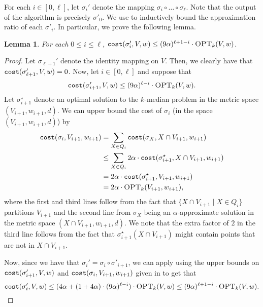 \documentclass[11pt]{article}
\newcommand{\1}{\mathmybb{1}}
\newtheorem{lemma}[theorem]{Lemma}
\newcommand{\OPT}{\textsc{OPT}}
\newcommand{\cost}{\textnormal{\texttt{cost}}}
\begin{document}
For each $i \in [0, \ell]$, let $\sigma_i'$ denote the mapping $\sigma_i \circ \dots \circ \sigma_\ell$. Note that the output of the algorithm is precisely $\sigma'_0$.
We use  to inductively bound the approximation ratio of each $\sigma'_i$. In particular, we prove the following lemma.

\begin{lemma}\label{lem:apx rec}
    For each $0 \leq i \leq \ell$, $\cost (\sigma'_{i}, V, w) \leq (9\alpha)^{\ell + 1 - i} \cdot \OPT_k(V, w)$.
\end{lemma}

\begin{proof}
    Let $\sigma_{\ell + 1}'$ denote the identity mapping on $V$. Then, we clearly have that $\cost(\sigma'_{\ell + 1}, V, w) = 0$.
    Now, let $i \in [0,\ell]$ and suppose that
    \begin{equation}\label{eq:apx 1}
        \cost (\sigma_{i+1}', V, w) \leq (9\alpha)^{\ell - i} \cdot \OPT_k(V, w).
    \end{equation}
    Let $\sigma^\star_{i+1}$ denote an optimal solution to the $k$-median problem in the metric space $(V_{i+1}, w_{i+1}, d)$.
    We can upper bound the cost of $\sigma_i$ (in the space $(V_{i+1}, w_{i+1}, d)$) by
    \begin{align}
        \cost(\sigma_i, V_{i+1}, w_{i+1}) &= \sum_{X \in Q_i} \cost(\sigma_X, X \cap V_{i+1}, w_{i+1})\nonumber\\
        &\leq \sum_{X \in Q_i} 2\alpha \cdot \cost(\sigma^\star_{i+1}, X \cap V_{i+1}, w_{i+1})\nonumber\\
        &= 2\alpha \cdot \cost(\sigma^\star_{i+1}, V_{i+1}, w_{i+1})\nonumber\\
        &= 2\alpha \cdot \OPT_k(V_{i+1}, w_{i+1}),\label{eq:apx 2}
    \end{align}
    where the first and third lines follow from the fact that $\{X \cap V_{i+1} \mid X \in Q_{i}\}$ partitions $V_{i+1}$ and
    the second line from $\sigma_X$ being an $\alpha$-approximate solution in the metric space $(X \cap V_{i+1}, w_{i+1}, d)$. We note that the extra factor of $2$ in the third line follows from the fact that $\sigma_{i+1}^\star(X \cap V_{i+1})$ might contain points that are not in $X \cap V_{i+1}$.
        
    Now, since we have that $\sigma_{i}' = \sigma_i \circ \sigma'_{i+1}$, we can apply  using the upper bounds on $\cost (\sigma_{i+1}', V, w)$ and $\cost(\sigma_i, V_{i+1}, w_{i+1})$ given in  to get that
    $$\cost(\sigma'_{i}, V, w) \leq (4\alpha + (1 + 4\alpha) \cdot (9\alpha)^{\ell - i}) \cdot \OPT_k(V,w) \leq (9\alpha)^{\ell + 1 - i} \cdot \OPT_k(V,w). \qedhere$$
\end{proof}
\end{document}
